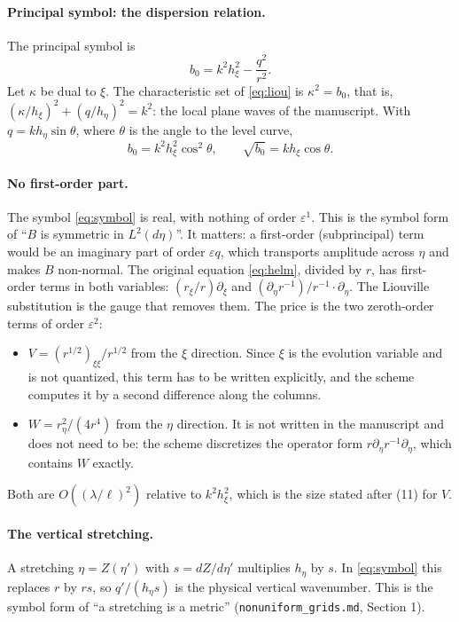 \documentclass[11pt]{article}
\newcommand{\pd}{\partial}
\begin{document}
\paragraph{Principal symbol: the dispersion relation.} The principal symbol is
\[
b_0=k^2h_\xi^2-\frac{q^2}{r^2}.
\]
Let $\kappa$ be dual to $\xi$. The characteristic set of
\eqref{eq:liou} is $\kappa^2=b_0$, that is,
$(\kappa/h_\xi)^2+(q/h_\eta)^2=k^2$: the local plane waves of the manuscript.
With $q=kh_\eta\sin\theta$, where $\theta$ is the angle to the level curve,
\begin{equation}\label{eq:angle}
b_0=k^2h_\xi^2\cos^2\theta,\qquad \sqrt{b_0}=kh_\xi\cos\theta .
\end{equation}

\paragraph{No first-order part.} The symbol \eqref{eq:symbol} is real, with
nothing of order $\varepsilon^1$. This is the symbol form of ``$B$ is symmetric
in $L^2(d\eta)$''. It matters: a first-order (subprincipal) term would be an
imaginary part of order $\varepsilon q$, which transports amplitude across
$\eta$ and makes $B$ non-normal. The original equation \eqref{eq:helm}, divided
by $r$, has first-order terms in both variables: $(r_\xi/r)\pd_\xi$ and
$(\pd_\eta r^{-1})/r^{-1}\cdot\pd_\eta$. The Liouville substitution is the gauge
that removes them. The price is the two zeroth-order terms of order
$\varepsilon^2$:
\begin{itemize}
\item $V=(r^{1/2})_{\xi\xi}/r^{1/2}$ from the $\xi$ direction. Since $\xi$ is
  the evolution variable and is not quantized, this term has to be written
  explicitly, and the scheme computes it by a second difference along the
  columns.
\item $W=r_\eta^2/(4r^4)$ from the $\eta$ direction. It is not written in the
  manuscript and does not need to be: the scheme discretizes the operator form
  $r\pd_\eta r^{-1}\pd_\eta$, which contains $W$ exactly.
\end{itemize}
Both are $O((\lambda/\ell)^2)$ relative to $k^2h_\xi^2$, which is the size
stated after (11) for $V$.

\paragraph{The vertical stretching.} A stretching $\eta=Z(\eta')$ with
$s=dZ/d\eta'$ multiplies $h_\eta$ by $s$. In \eqref{eq:symbol} this replaces $r$
by $rs$, so $q'/(h_\eta s)$ is the physical vertical wavenumber. This is the
symbol form of ``a stretching is a metric'' (\texttt{nonuniform\_grids.md},
Section 1).
\end{document}
